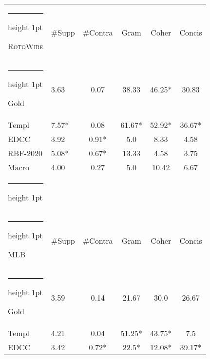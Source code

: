 \documentclass[11pt,a4paper]{article}
\makeatletter
\newcommand{\thickhline}{\noalign {\ifnum 0=`}\fi \hrule height 1pt
    \futurelet \reserved@a \@xhline
}
\makeatother
\begin{document}
\begin{table}[t]
\footnotesize
\centering
\begin{tabular}{@{}l@{~~}l@{~~}c@{~~}c@{~~}c@{~~}c@{}}
\thickhline
\textsc{RotoWire} & \#Supp & \#Contra & Gram & Coher & Concis \\
\thickhline
Gold    & 3.63 & 0.07\hspace*{0.15cm} & 38.33  & 46.25*&  30.83\\
Templ   & 7.57* & 0.08\hspace*{0.15cm} & \hspace*{-0.1cm}61.67* &  \hspace*{-0.1cm}52.92* & \hspace*{-0.1cm}36.67*\\
EDCC  & 3.92 & 0.91* & \hspace*{0.1cm}5.0 & \hspace*{-0.1cm}8.33  & \hspace*{-0.1cm}4.58\\
RBF-2020   & 5.08* & 0.67* & \hspace*{-0.16cm}13.33 & \hspace*{0.15cm}4.58 & \hspace*{0.15cm}3.75\\
Macro  & 4.00 & 0.27\hspace*{0.15cm} & \hspace*{-0.16cm}5.0 & \hspace*{-0.04cm}10.42&\hspace*{0.15cm}6.67\\ \thickhline
\multicolumn{6}{c}{} \\
\thickhline
MLB & \#Supp & \#Contra & Gram & Coher & Concis \\ \thickhline
Gold    & 3.59 & \hspace*{-0.1cm}0.14 & \hspace*{0.3cm}21.67\hspace*{.3cm} & \hspace*{-.25cm}30.0 & 26.67 \\
Templ   & 4.21 & \hspace*{-0.1cm}0.04 & \hspace*{-0.1cm}51.25* & \hspace*{-.3cm}43.75*& \hspace*{-.05cm}7.5 \\
EDCC & 3.42 & \hspace*{0.05cm}0.72* & \hspace*{0.28cm}22.5* \hspace*{.3cm} & \hspace*{-.4cm}12.08* & \hspace*{-.05cm}39.17*  \\

\end{tabular}
\end{table}
\end{document}
